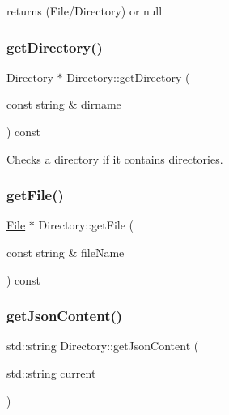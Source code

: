 returns (File/\+Directory) or null 

\mbox{\label{class_directory_a1deb0931a93badb556a4faed75cbc033}} 
\subsubsection{\texorpdfstring{get\+Directory()}{getDirectory()}}
{\footnotesize\ttfamily \hyperlink{class_directory}{Directory} $\ast$ Directory\+::get\+Directory (\begin{DoxyParamCaption}\item[{const string \&}]{dirname }\end{DoxyParamCaption}) const}



Checks a directory if it contains directories. 

\mbox{\label{class_directory_a3a7c1f0d955b7c3a73f6701db1fdf72b}} 
\subsubsection{\texorpdfstring{get\+File()}{getFile()}}
{\footnotesize\ttfamily \hyperlink{class_file}{File} $\ast$ Directory\+::get\+File (\begin{DoxyParamCaption}\item[{const string \&}]{file\+Name }\end{DoxyParamCaption}) const}

\mbox{\label{class_directory_ad4b9f8d48a33526ac1c61dbce3753f1d}} 
\subsubsection{\texorpdfstring{get\+Json\+Content()}{getJsonContent()}}
{\footnotesize\ttfamily std\+::string Directory\+::get\+Json\+Content (\begin{DoxyParamCaption}\item[{std\+::string}]{current }\end{DoxyParamCaption})}

